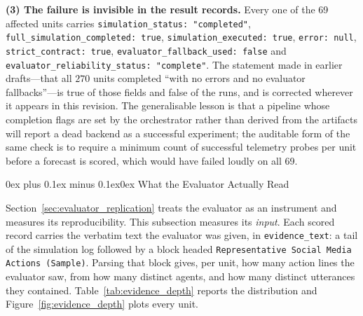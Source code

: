 \documentclass[11pt,journal,onecolumn]{IEEEtran}
\makeatletter
\renewcommand\subsubsection{\@startsection{subsubsection}{3}{\parindent}%
  {0ex plus 0.1ex minus 0.1ex}{0ex}%
  {\normalfont\normalsize\bfseries\itshape}}
\makeatother
\begin{document}
\textbf{(3) The failure is invisible in the result records.} Every one of the 69 affected units carries \texttt{simulation\_status: "completed"}, \texttt{full\_simulation\_completed: true}, \texttt{simulation\_executed: true}, \texttt{error: null}, \texttt{strict\_contract: true}, \texttt{evaluator\_fallback\_used: false} and \texttt{evaluator\_reliability\_status: "complete"}. The statement made in earlier drafts---that all $270$ units completed ``with no errors and no evaluator fallbacks''---is true of those fields and false of the runs, and is corrected wherever it appears in this revision. The generalisable lesson is that a pipeline whose completion flags are set by the orchestrator rather than derived from the artifacts will report a dead backend as a successful experiment; the auditable form of the same check is to require a minimum count of successful telemetry probes per unit before a forecast is scored, which would have failed loudly on all 69.

\subsubsection{What the Evaluator Actually Read}
\label{sec:evidence_depth}

Section~\ref{sec:evaluator_replication} treats the evaluator as an instrument and measures its reproducibility. This subsection measures its \emph{input}. Each scored record carries the verbatim text the evaluator was given, in \texttt{evidence\_text}: a tail of the simulation log followed by a block headed \texttt{Representative Social Media Actions (Sample)}. Parsing that block gives, per unit, how many action lines the evaluator saw, from how many distinct agents, and how many distinct utterances they contained. Table~\ref{tab:evidence_depth} reports the distribution and Figure~\ref{fig:evidence_depth} plots every unit.
\end{document}

